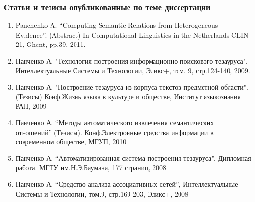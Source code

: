 \begin{frame}
\frametitle{Статьи и тезисы опубликованные по теме диссертации}
\begin{enumerate}
  \footnotesize
  \setcounter{enumi}{6}
  
  
  
\item Panchenko A. “Computing Semantic Relations from Heterogeneous Evidence”.  (Abstract) In Computational Linguistics in the Netherlands CLIN 21, Ghent, pp.39, 2011.

\item Панченко А. "Технология построения информационно-поискового тезауруса", Интеллектуальные Системы и Технологии, Эликс+, том. 9, стр.124-140, 2009. 

\item Панченко А. "Построение тезауруса из корпуса текстов предметной области". (Тезисы) Конф.Жизнь языка в культуре и обществе, Институт языкознания РАН, 2009 

\item Панченко А. “Методы автоматического извлечения семантических отношений” (Тезисы). Конф.Электронные средства информации в современном обществе, МГУП, 2010  

\item Панченко А. “Автоматизированная система построения тезауруса”. Дипломная работа. МГТУ им.Н.Э.Баумана, 177 страниц, 2008 

\item Панченко А. “Средство анализа ассоциативных сетей”, Интеллектуальные Системы и Технологии, том.9, стр.169-203, Эликс+, 2008

\end{enumerate}



\end{frame}

